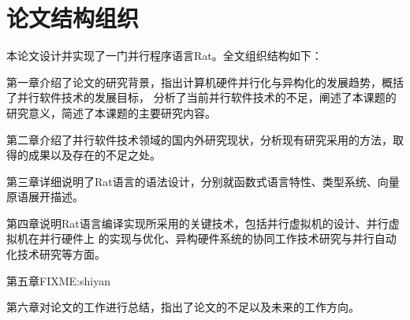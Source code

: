 \section{论文结构组织}
本论文设计并实现了一门并行程序语言Rat。全文组织结构如下：

第一章介绍了论文的研究背景，指出计算机硬件并行化与异构化的发展趋势，概括了并行软件技术的发展目标，
分析了当前并行软件技术的不足，阐述了本课题的研究意义，简述了本课题的主要研究内容。

第二章介绍了并行软件技术领域的国内外研究现状，分析现有研究采用的方法，取得的成果以及存在的不足之处。

第三章详细说明了Rat语言的语法设计，分别就函数式语言特性、类型系统、向量原语展开描述。

第四章说明Rat语言编译实现所采用的关键技术，包括并行虚拟机的设计、并行虚拟机在并行硬件上
的实现与优化、异构硬件系统的协同工作技术研究与并行自动化技术研究等方面。

第五章FIXME:shiyan

第六章对论文的工作进行总结，指出了论文的不足以及未来的工作方向。




